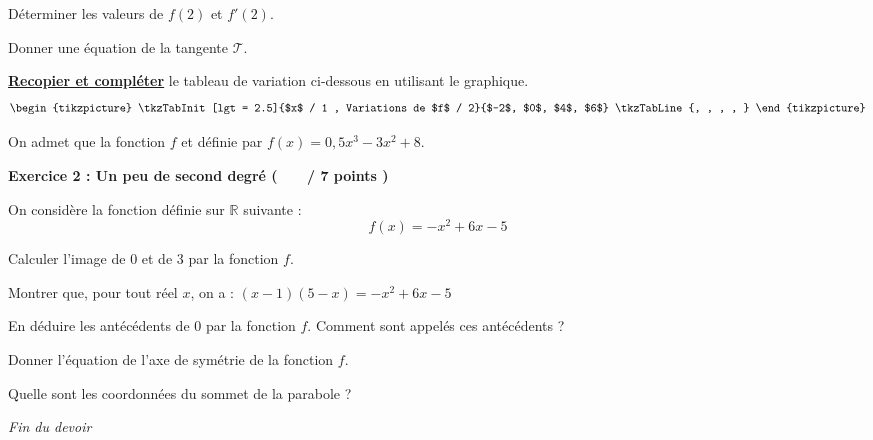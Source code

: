 \documentclass[12pt,a4paper]{exam}
\begin{document}
\begin{questions}

\question[2] Déterminer les valeurs de $f(2)$ et $f'(2)$.

\question[2] Donner une équation de la tangente $\mathcal{T}$.

\question[2] \underline{\textbf{Recopier et compléter}} le tableau de variation ci-dessous en utilisant 
le graphique.
$$
\begin{tikzpicture}
    \tkzTabInit[lgt = 2.5]{$x$ / 1 , Variations de $f$ / 2}{$-2$, $0$, $4$, $6$}
    \tkzTabLine{, , , , }
\end{tikzpicture}
$$

\question On admet que la fonction $f$ et définie par $f(x) = 0,5x^3-3x^2 + 8$.
\end{questions}

\vspace{0.5cm}

\noindent
\textbf{Exercice 2 : Un peu de second degré ( \ \ \ / 7 points )}

\vspace{5pt}
\noindent
On considère la fonction définie sur $\mathbb{R}$ suivante :
\[
f(x) = -x^2 + 6x - 5
\]

\begin{questions}

\question[2] Calculer l'image de 0 et de 3 par la fonction $f$.

\question[2] Montrer que, pour tout réel $x$, on a : $(x-1)(5 - x) = -x^2 + 6x - 5$

\question[1] En déduire les antécédents de 0 par la fonction $f$. Comment sont appelés ces antécédents ?

\question[1] Donner l'équation de l'axe de symétrie de la fonction $f$.

\question[1] Quelle sont les coordonnées du sommet de la parabole ?

\end{questions}

\vspace{0.5cm}

\begin{center}
    \textit{Fin du devoir}
\end{center}
\end{document}
